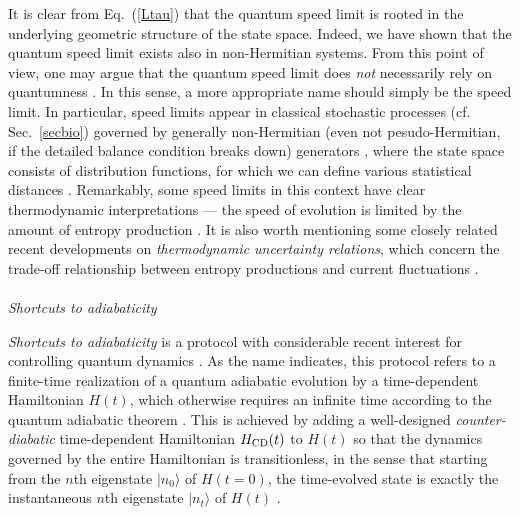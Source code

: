 \documentclass{tADP2e}
\theoremstyle{plain}
\theoremstyle{plain}
\theoremstyle{definition}
\begin{document}
It is clear from Eq.~(\ref{Ltau}) that the quantum speed limit is rooted in the underlying geometric structure of the state space. 
Indeed, we have shown that the quantum speed limit exists also in non-Hermitian systems. From this point of view, one may argue that the quantum speed limit does \emph{not} necessarily rely on quantumness \cite{SB18,OM18}. In this sense, a more appropriate name should simply be the speed limit. In particular, speed limits appear in classical stochastic processes (cf. Sec.~\ref{secbio}) governed by generally non-Hermitian (even not pesudo-Hermitian, if the detailed balance condition breaks down) generators \cite{SN18}, where the state space consists of distribution functions, for which we can define various statistical distances \cite{TMC06}. Remarkably, some speed limits in this context have clear thermodynamic interpretations --- the speed of evolution is limited by the amount of entropy production \cite{SN18,AD18}. It is also worth mentioning some closely related recent developments on  
\emph{thermodynamic uncertainty relations}, which concern the trade-off relationship between entropy productions and current fluctuations \cite{BAC15,GTR16,HY19,HJM20,KL19}. 
\\ \\ {\it Shortcuts to adiabaticity}

\vspace{3pt}
\noindent
\emph{Shortcuts to adiabaticity} is a protocol with considerable recent interest for controlling quantum dynamics \cite{GOD19}. As the name indicates, this protocol refers to a finite-time realization of a quantum adiabatic evolution by a time-dependent Hamiltonian $H(t)$, which otherwise requires an infinite time according to the quantum adiabatic theorem \cite{BM28}. This is achieved by adding a well-designed \emph{counter-diabatic} time-dependent Hamiltonian $H_{\rm CD}(t)$ to $H(t)$ so that the dynamics governed by the entire Hamiltonian is transitionless, in the sense that starting from the $n$th eigenstate $|n_0\rangle$ of $H(t=0)$, the time-evolved state is exactly the instantaneous $n$th eigenstate $|n_t\rangle$ of $H(t)$ \cite{MVB09}. 
\end{document}
